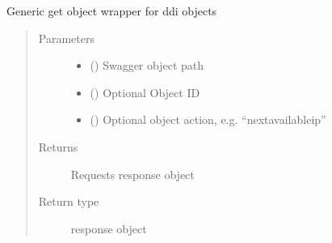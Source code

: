 \documentclass[letterpaper,10pt,english]{sphinxmanual}
\begin{document}
\begin{fulllineitems}
\begin{fulllineitems}
\begin{quote}
\begin{description}
\end{description}\end{quote}

\end{fulllineitems}


\begin{fulllineitems}
\label{\detokenize{b1ddi-class:bloxone.b1ddi.get}}
\sphinxAtStartPar
Generic get object wrapper for ddi objects
\begin{quote}\begin{description}
\item[{Parameters}] \leavevmode\begin{itemize}
\item {} 
\sphinxAtStartPar
{} () \textendash{} Swagger object path

\item {} 
\sphinxAtStartPar
{} () \textendash{} Optional Object ID

\item {} 
\sphinxAtStartPar
{} () \textendash{} Optional object action, e.g. “nextavailableip”

\end{itemize}

\item[{Returns}] \leavevmode
\sphinxAtStartPar
Requests response object

\item[{Return type}] \leavevmode
\sphinxAtStartPar
response object

\end{description}\end{quote}

\end{fulllineitems}



\end{fulllineitems}
\end{document}
